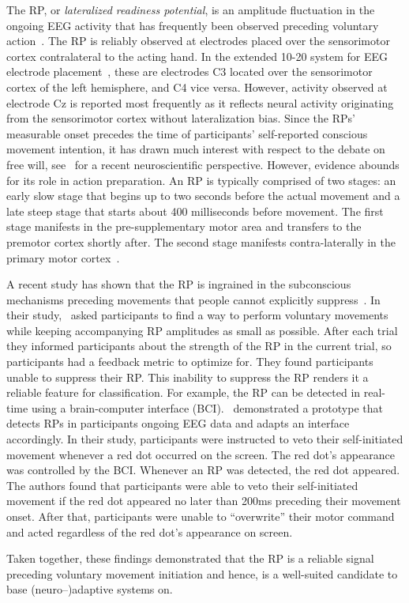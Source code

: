 The RP, or \textit{lateralized readiness potential}, is an amplitude fluctuation in the ongoing EEG activity that has frequently been observed preceding voluntary action~\cite{Deecke1969-bl, Libet1983-qu}. The RP is reliably observed at electrodes placed over the sensorimotor cortex contralateral to the acting hand. In the extended 10-20 system for EEG electrode placement~\cite{Jasper1983-uw}, these are electrodes C3 located over the sensorimotor cortex of the left hemisphere, and C4 vice versa. However, activity observed at electrode Cz is reported most frequently as it reflects neural activity originating from the sensorimotor cortex without lateralization bias. Since the RPs' measurable onset precedes the time of participants' self-reported conscious movement intention, it has drawn much interest with respect to the debate on free will, see~\cite{Schurger2021-vp} for a recent neuroscientific perspective. However, evidence abounds for its role in action preparation. An RP is typically comprised of two stages: an early slow stage that begins up to two seconds before the actual movement and a late steep stage that starts about 400 milliseconds before movement. The first stage manifests in the pre-supplementary motor area and transfers to the premotor cortex shortly after. The second stage manifests contra-laterally in the primary motor cortex~\cite{Shibasaki2006-mt}. 

A recent study has shown that the RP is ingrained in the subconscious mechanisms preceding movements that people cannot explicitly suppress~\cite{Schultze-Kraft2021-cu}. In their study,~\citet{Schultze-Kraft2021-cu} asked participants to find a way to perform voluntary movements while keeping accompanying RP amplitudes as small as possible. After each trial they informed participants about the strength of the RP in the current trial, so participants had a feedback metric to optimize for. They found participants unable to suppress their RP. This inability to suppress the RP renders it a reliable feature for classification. For example, the RP can be detected in real-time using a brain-computer interface (BCI).~\citet{Schultze-Kraft2016-bx} demonstrated a prototype that detects RPs in participants ongoing EEG data and adapts an interface accordingly. In their study, participants were instructed to veto their self-initiated movement whenever a red dot occurred on the screen. The red dot's appearance was controlled by the BCI. Whenever an RP was detected, the red dot appeared. The authors found that participants were able to veto their self-initiated movement if the red dot appeared no later than 200ms preceding their movement onset. After that, participants were unable to ``overwrite'' their motor command and acted regardless of the red dot's appearance on screen.

Taken together, these findings demonstrated that the RP is a reliable signal preceding voluntary movement initiation and hence, is a well-suited candidate to base (neuro--)adaptive systems on.
